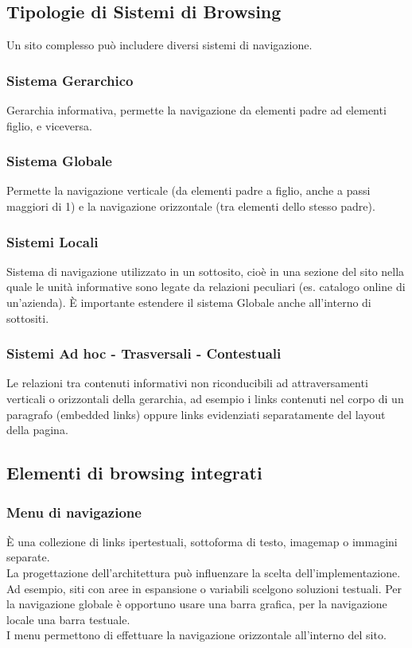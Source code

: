 \documentclass{article}
\begin{document}
\subsection{Tipologie di Sistemi di Browsing}
Un sito complesso può includere diversi sistemi di navigazione.
\subsubsection{Sistema Gerarchico}
Gerarchia informativa, permette la navigazione da elementi padre ad elementi figlio, e viceversa.
\subsubsection{Sistema Globale}
Permette la navigazione verticale (da elementi padre a figlio, anche a passi maggiori di 1) e la navigazione orizzontale (tra elementi dello stesso padre).
\subsubsection{Sistemi Locali}
Sistema di navigazione utilizzato in un sottosito, cioè in una sezione del sito nella quale le unità informative sono legate da relazioni peculiari (es. catalogo online di un'azienda). È importante estendere il sistema Globale anche all'interno di sottositi.
\subsubsection{Sistemi Ad hoc - Trasversali - Contestuali}
Le relazioni tra contenuti informativi non riconducibili ad attraversamenti verticali o orizzontali della gerarchia, ad esempio i links contenuti nel corpo di un paragrafo (embedded links) oppure links evidenziati separatamente del layout della pagina.
\subsection{Elementi di browsing integrati}
\subsubsection{Menu di navigazione}
È una collezione di links ipertestuali, sottoforma di testo, imagemap o immagini separate.\\
La progettazione dell'architettura può influenzare la scelta dell'implementazione. Ad esempio, siti con aree in espansione o variabili scelgono soluzioni testuali. Per la navigazione globale è opportuno usare una barra grafica, per la navigazione locale una barra testuale.\\
I menu permettono di effettuare la navigazione orizzontale all'interno del sito.\\
\end{document}
